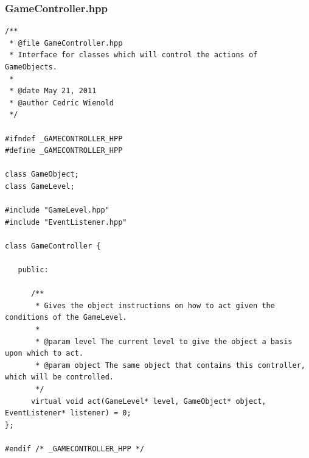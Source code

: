 \documentclass[12pt]{article}
\begin{document}
\subsubsection{GameController.hpp}
\begin{lstlisting}[breaklines]
/**
 * @file GameController.hpp
 * Interface for classes which will control the actions of GameObjects.
 *
 * @date May 21, 2011
 * @author Cedric Wienold
 */

#ifndef _GAMECONTROLLER_HPP
#define _GAMECONTROLLER_HPP

class GameObject;
class GameLevel;

#include "GameLevel.hpp"
#include "EventListener.hpp"

class GameController {
   
   public:
   
      /**
       * Gives the object instructions on how to act given the conditions of the GameLevel.
       * 
       * @param level The current level to give the object a basis upon which to act.
       * @param object The same object that contains this controller, which will be controlled.
       */
      virtual void act(GameLevel* level, GameObject* object, EventListener* listener) = 0;
};

#endif /* _GAMECONTROLLER_HPP */
\end{lstlisting}
\end{document}
